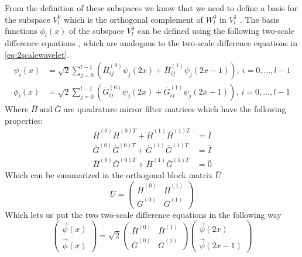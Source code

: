 \documentclass[../master_thesis.tex]{subfiles}
\begin{document}
From the definition of these subspaces
we know that we need to define a basis for the subspace $V_l^0$ which is the
orthogonal complement of $W^0_l$ in $V_l^1$ \cite{Alpert1993}. The basis functions
$\phi_i(x)$ of the subspace $V_l^0$ can be defined using the following two-scale
difference equations \cite{Beylkin1999AdaptiveSO}, which are analogous to the
two-scale difference equations in \ref{eq:2scalewavelet}.
\begin{align}
  \psi_i(x) &= \sqrt{2}\sum^{l-1}_{j=0}\left(\bar{H}^{(0)}_{ij}\psi_j(2x) + \bar{H}^{(1)}_{ij}\psi_j(2x-1)\right), \ i = 0,...,l-1 \\
  \phi_i(x) &= \sqrt{2}\sum^{l-1}_{j=0}\left(\bar{G}^{(0)}_{ij}\psi_j(2x) + \bar{G}^{(1)}_{ij}\psi_j(2x-1)\right), \ i = 0,...,l-1
\end{align}
Where $ \bar{H} \ \text{and}\ \bar{G} $ are quadrature mirror filter matrices \cite{Beylkin1999AdaptiveSO} which have
the following properties:
\begin{align}
  \bar{H}^{(0)}\bar{H}^{(0)T} + \bar{H}^{(1)}\bar{H}^{(1)T} &= \bar{I} \\
  \bar{G}^{(0)}\bar{G}^{(0)T} + \bar{G}^{(1)}\bar{G}^{(1)T} &= \bar{I} \\
  \bar{H}^{(0)}\bar{G}^{(0)T} + \bar{H}^{(1)}\bar{G}^{(1)T} &= \bar{0}
\end{align}
Which can be summarized in the orthogonal block matrix $\bar{U}$ \cite{Beylkin1999AdaptiveSO}
\begin{equation}
  \bar{U} =
  \begin{pmatrix}
    \bar{H}^{(0)} & \bar{H}^{(1)} \\
    \bar{G}^{(0)} & \bar{G}^{(1)}
  \end{pmatrix}
\end{equation}
Which lets us put the two two-scale difference equations in the following way \cite{Sorland}
\begin{equation}
  \begin{pmatrix}
    \vec{\psi}(x) \\
    \vec{\phi}(x)
  \end{pmatrix}
  = \sqrt{2}
  \begin{pmatrix}
    \bar{H}^{(0)} & \bar{H}^{(1)} \\
    \bar{G}^{(0)} & \bar{G}^{(1)}
  \end{pmatrix}
  \begin{pmatrix}
    \vec{\psi}(2x) \\
    \vec{\psi}(2x-1)
  \end{pmatrix}
\end{equation}
\end{document}

